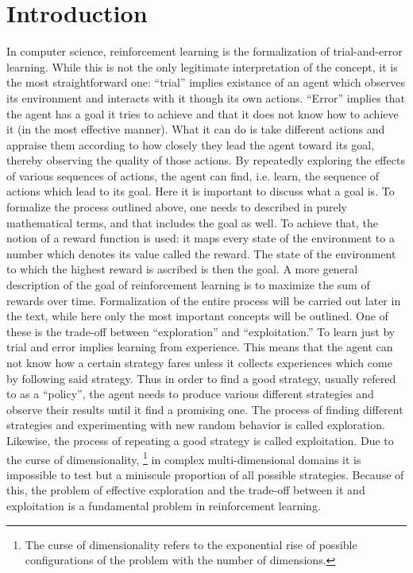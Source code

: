 \chapter{Introduction}

In computer science, reinforcement learning is the formalization of trial-and-error learning.
While this is not the only legitimate interpretation of the concept, it is the most straightforward one:
``trial'' implies existance of an agent which observes its environment and interacts with it 
though its own actions.
``Error'' implies that the agent has a goal it tries to achieve and
that it does not know how to achieve it (in the most effective manner). 
What it can do is take different actions and appraise them
according to how closely they lead the agent toward its goal, thereby observing
the quality of those actions.
By repeatedly exploring the effects of various sequences of actions, the agent
can find, i.e. learn, the sequence of actions which lead to its goal.
Here it is important to discuss what a goal is.
To formalize the process outlined above, one needs to described
in purely mathematical terms, and that includes the goal as well.
To achieve that, the notion of a reward function is used:
it maps every state of the environment to a number which denotes
its value called the reward. 
The state of the environment to which the highest reward is ascribed
is then the goal.
A more general description of the goal of reinforcement learning
is to maximize the sum of rewards over time.
Formalization of the entire process will be carried out later in the text,
while here only the most important concepts will be outlined.
One of these is the trade-off between ``exploration''
and ``exploitation.''
To learn just by trial and error implies learning from experience.
This means that the agent can not know 
how a certain strategy fares unless it collects experiences 
which come by following said strategy.
Thus in order to find a good strategy,
usually refered to as a ``policy'',
the agent needs to produce various different strategies and observe their results
until it find a promising one.
The process of finding different strategies and experimenting with new random
behavior is called exploration.
Likewise, the process of repeating a good strategy is called exploitation.
Due to the curse of dimensionality, 
\footnote{The curse of dimensionality refers to the exponential rise of 
possible configurations of the problem with the number of dimensions.}
in complex multi-dimensional domains it is impossible to test but a miniscule proportion 
of all possible strategies.
Because of this, the problem of effective exploration and the trade-off between
it and exploitation is a fundamental problem in reinforcement learning.

